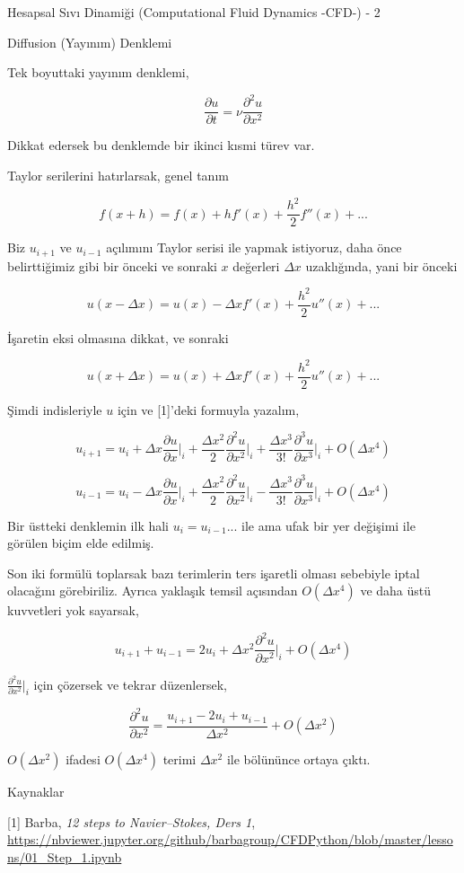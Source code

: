 \documentclass[12pt,fleqn]{article}\usepackage{../../common}
\begin{document}
Hesapsal Sıvı Dinamiği (Computational Fluid Dynamics -CFD-) - 2

Diffusion (Yayınım) Denklemi

Tek boyuttaki yayınım denklemi,

$$
\frac{\partial u}{\partial t} = \nu \frac{\partial^2 u}{\partial x^2}
$$

Dikkat edersek bu denklemde bir ikinci kısmi türev var.

Taylor serilerini hatırlarsak, genel tanım

$$
f(x+h) = f(x) + h f'(x) + \frac{h^2}{2} f''(x) + ...
$$

Biz $u_{i+1}$ ve $u_{i-1}$ açılımını Taylor serisi ile yapmak istiyoruz, daha
önce belirttiğimiz gibi bir önceki ve sonraki $x$ değerleri $\Delta x$
uzaklığında, yani bir önceki

$$
u(x-\Delta x) = u(x) - \Delta x f'(x) + \frac{h^2}{2} u''(x) + ...
$$

İşaretin eksi olmasına dikkat, ve sonraki 

$$
u(x+\Delta x) = u(x) + \Delta x f'(x) + \frac{h^2}{2} u''(x) + ...
$$

Şimdi indisleriyle $u$ için ve [1]'deki formuyla yazalım,

$$
u_{i+1} = u_i + \Delta x \frac{\partial u}{\partial x}\bigg|_i +
\frac{\Delta x^2}{2} \frac{\partial ^2 u}{\partial x^2}\bigg|_i +
\frac{\Delta x^3}{3!} \frac{\partial ^3 u}{\partial x^3}\bigg|_i +
O(\Delta x^4)
$$

$$
u_{i-1} = u_i - \Delta x \frac{\partial u}{\partial x}\bigg|_i +
\frac{\Delta x^2}{2} \frac{\partial ^2 u}{\partial x^2}\bigg|_i -
\frac{\Delta x^3}{3!} \frac{\partial ^3 u}{\partial x^3}\bigg|_i +
O(\Delta x^4)
$$

Bir üstteki denklemin ilk hali $u_i = u_{i-1} ... $ ile ama ufak bir yer
değişimi ile görülen biçim elde edilmiş. 

Son iki formülü toplarsak bazı terimlerin ters işaretli olması sebebiyle iptal
olacağını görebiriliz. Ayrıca yaklaşık temsil açısından $O(\Delta x^4)$ ve daha
üstü kuvvetleri yok sayarsak, 

$$
u_{i+1} + u_{i-1} =
2u_i+\Delta x^2 \frac{\partial ^2 u}{\partial x^2}\bigg|_i +
O(\Delta x^4)
$$

$\frac{\partial ^2 u}{\partial x^2}\bigg|_i$ için çözersek ve tekrar düzenlersek,

$$
\frac{\partial ^2 u}{\partial x^2}=\frac{u_{i+1}-2u_{i}+u_{i-1}}{\Delta x^2} + O(\Delta x^2)
$$

$O(\Delta x^2)$ ifadesi $O(\Delta x^4)$ terimi $\Delta x^2$ ile bölününce ortaya çıktı.




Kaynaklar

[1] Barba, {\em 12 steps to Navier–Stokes, Ders 1},
    \url{https://nbviewer.jupyter.org/github/barbagroup/CFDPython/blob/master/lessons/01_Step_1.ipynb}
\end{document}
